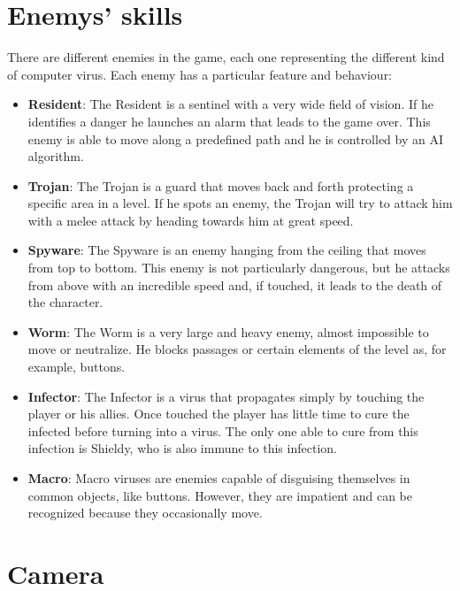 \documentclass[12pt, a4paper]{report}
\begin{document}
\section*{Enemys' skills}
There are different enemies in the game, each one representing the different kind of computer virus. Each enemy has a particular feature and behaviour:
\begin{itemize}
	\item \textbf{Resident}: The Resident is a sentinel with a very wide field of vision. If he identifies a danger he launches an alarm that leads to the game over. This enemy is able to move along a predefined path and he is controlled by an AI algorithm.
	\item \textbf{Trojan}: The Trojan is a guard that moves back and forth protecting a specific area in a level. If he spots an enemy, the Trojan will try to attack him with a melee attack by heading towards him at great speed.
	\item \textbf{Spyware}: The Spyware is an enemy hanging from the ceiling that moves from top to bottom. This enemy is not particularly dangerous, but he attacks from above with an incredible speed and, if touched, it leads to the death of the character.
	\item \textbf{Worm}: The Worm is a very large and heavy enemy, almost impossible to move or neutralize. He blocks passages or certain elements of the level as, for example, buttons.
	\item \textbf{Infector}: The Infector is a virus that propagates simply by touching the player or his allies. Once touched the player has little time to cure the infected before turning into a virus. The only one able to cure from this infection is Shieldy, who is also immune to this infection.
	\item \textbf{Macro}: Macro viruses are enemies capable of disguising themselves in common objects, like buttons. However, they are impatient and can be recognized because they occasionally move.
\end{itemize}




\section*{Camera}
\end{document}
